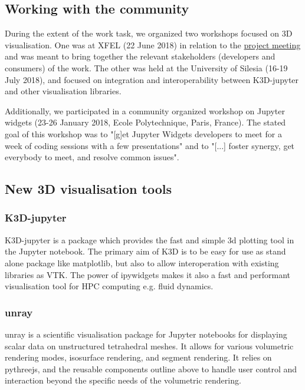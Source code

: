 \documentclass{deliverablereport}
\begin{document}


\subsection{Working with the community}\label{community}

During the extent of the work task, we organized two workshops focused on 3D visualisation.
One was at XFEL (22 June 2018) in relation to the \href{https://opendreamkit.org/2018/06/20/Hamburg-DisseminationWorkshop-SteeringMeeting/}{project meeting} and was meant to bring together the relevant stakeholders (developers and consumers) of the work. The other was held at the University of Silesia (16-19 July 2018), and focused on integration and interoperability between K3D-jupyter and other visualisation libraries.

Additionally, we participated in a community organized workshop on Jupyter widgets (23-26 January 2018, Ecole Polytechnique, Paris, France). The stated goal of this workshop was to "[g]et Jupyter Widgets developers to meet for a week of coding sessions with a few presentations" and to "[...] foster synergy, get everybody to meet, and resolve common issues".


\subsection{New 3D visualisation tools}\label{new-3d}


\subsubsection{K3D-jupyter}

K3D-jupyter is a package which provides the fast and simple 3d
plotting tool in the Jupyter notebook. The primary aim of K3D is to be
easy for use as stand alone package like matplotlib, but also to
allow interoperation with existing libraries as VTK. The power of
ipywidgets makes it also a fast and performant visualisation tool for
HPC computing e.g. fluid dynamics.


\subsubsection{unray}

unray is a scientific visualisation package for Jupyter notebooks for displaying
scalar data on unstructured tetrahedral meshes. It allows for various volumetric
rendering modes, isosurface rendering, and segment rendering.
It relies on pythreejs, and the reusable components outline above to handle
user control and interaction beyond the specific needs of the volumetric
rendering.
\end{document}
